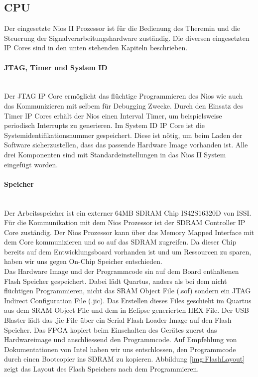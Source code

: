 \subsection{CPU}\label{subsec:CPU}
Der eingesetzte Nios II Prozessor ist für die Bedienung des Theremin und die Steuerung der Signalverarbeitungshardware zuständig. Die diversen eingesetzten IP Cores sind in den unten stehenden Kapiteln beschrieben.

\paragraph{JTAG, Timer und System ID}\mbox{}\\

Der JTAG IP Core ermöglicht das flüchtige Programmieren des Nios wie auch das Kommunizieren mit selbem für Debugging Zwecke. 
Durch den Einsatz des Timer IP Cores erhält der Nios einen Interval Timer, um beispielsweise periodisch Interrupts zu generieren. 
Im System ID IP Core ist die Systemidentifikationsnummer gespeichert. Diese ist nötig, um beim Laden der Software sicherzustellen, dass das passende Hardware Image vorhanden ist.
Alle drei Komponenten sind mit Standardeinstellungen in das Nios II System eingefügt worden.

\paragraph{Speicher}\mbox{}\\

Der Arbeitsspeicher ist ein externer 64MB SDRAM Chip IS42S16320D von ISSI. Für die Kommunikation mit dem Nios Prozessor ist der SDRAM Controller IP Core zuständig. Der Nios Prozessor kann über das Memory Mapped Interface mit dem Core kommunizieren und so auf das SDRAM zugreifen. Da dieser Chip bereits auf dem Entwicklungsboard vorhanden ist und um Ressourcen zu sparen, haben wir uns gegen On-Chip Speicher entschieden.\\

Das Hardware Image und der Programmcode sin auf dem Board enthaltenen Flash Speicher gespeichert. Dabei lädt Quartus, anders als bei dem nicht flüchtigen Programmieren, nicht das SRAM Object File (.sof) sondern ein JTAG Indirect Configuration File (.jic). Das Erstellen dieses Files geschieht im Quartus aus dem SRAM Object File und dem in Eclipse generierten HEX File. Der USB Blaster lädt das .jic File über ein Serial Flash Loader Image auf den Flash Speicher. Das FPGA kopiert beim Einschalten des Gerätes zuerst das Hardwareimage und anschliessend den Programmcode. Auf Empfehlung von Dokumentationen von Intel haben wir uns entschlossen, den Programmcode durch einen Bootcopier ins SDRAM zu kopieren. Abbildung \ref{img:FlashLayout} zeigt das Layout des Flash Speichers nach dem Programmieren. \cite{non_volatile}

